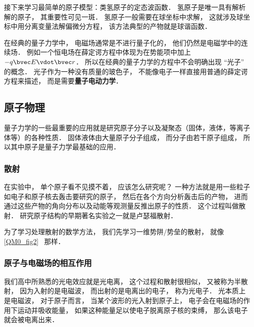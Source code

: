 接下来学习最简单的原子模型：类氢原子的定态波函数． 氢原子是唯一具有解析解的原子， 其重要性可见一斑． 氢原子一般需要在球坐标中求解， 这就涉及球坐标中用分离变量法解偏微分方程， 该方法典型的产物就是球谐函数．

在经典的量子力学中， 电磁场通常是不进行量子化的， 他们仍然是电磁学中的连续场． 例如一个恒电场在薛定谔方程中体现为在势能项中加上 $-q\bvec E \vdot \bvec r$． 所以在经典的量子力学的方程中不会明确出现 “光子” 的概念． 光子作为一种没有质量的玻色子， 不能像电子一样直接用普通的薛定谔方程来描述， 而是需要\textbf{量子电动力学}．

\subsection{原子物理}
量子力学的一些最重要的应用就是研究原子分子以及凝聚态（固体，液体，等离子体等）的各种性质． 固体液体由大量原子分子组成， 而分子由若干原子组成， 所以其中原子是量子力学最基础的应用．

\subsubsection{散射}
在实验中， 单个原子看不见摸不着， 应该怎么研究呢？ 一种方法就是用一些粒子如电子和原子核去轰击要研究的原子， 然后在各个方向分析轰击后的产物， 进而通过这些产物的角向分布以及动能等观测量反推出原子的性质． 这个过程叫做散射． 研究原子结构的早期著名实验之一就是卢瑟福散射．

为了学习处理散射的数学方法， 我们先学习一维势阱/势垒的散射， 就像\autoref{QM0_fig2}~ 那样．

\subsubsection{原子与电磁场的相互作用}
我们高中所熟悉的光电效应就是光电离， 这个过程和散射很相似， 又被称为半散射， 因为入射的是电磁波， 而出射的是电离出的电子， 称为光电子． 光本质上是电磁波， 对于原子而言， 当某个波形的光入射到原子上， 电子会在电磁场的作用下运动并吸收能量， 如果这种能量足以使电子脱离原子核的束缚， 那么该电子就会被电离出来．
